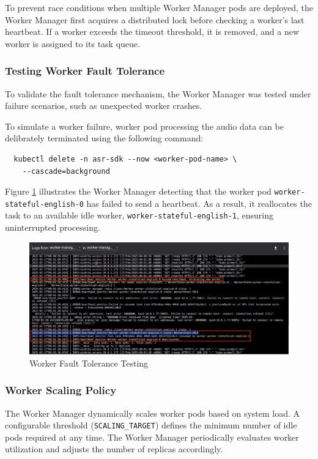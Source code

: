 To prevent race conditions when multiple Worker Manager pods are deployed, the Worker Manager first acquires a distributed lock before checking a worker’s last heartbeat. If a worker exceeds the timeout threshold, it is removed, and a new worker is assigned to its task queue.

\subsubsection{Testing Worker Fault Tolerance}
To validate the fault tolerance mechanism, the Worker Manager was tested under failure scenarios, such as unexpected worker crashes.

To simulate a worker failure, worker pod processing the audio data can be delibrately terminated using the following command:
\begin{verbatim}
  kubectl delete -n asr-sdk --now <worker-pod-name> \
    --cascade=background
\end{verbatim}

Figure \ref{fig:worker_fault_tolerance} illustrates the Worker Manager detecting that the worker pod \texttt{worker-\allowbreak stateful-english-0} has failed to send a heartbeat. As a result, it reallocates the task to an available idle worker, \texttt{worker-stateful-english-1}, ensuring uninterrupted processing.

\begin{figure}[ht]
  \centering
  \includegraphics[width=\textwidth]{figures/worker_fault_tolerance.png}
  \caption{Worker Fault Tolerance Testing}
  \label{fig:worker_fault_tolerance}
\end{figure}

\subsubsection{Worker Scaling Policy}
The Worker Manager dynamically scales worker pods based on system load. A configurable threshold (\texttt{SCALING\_TARGET}) defines the minimum number of idle pods required at any time. The Worker Manager periodically evaluates worker utilization and adjusts the number of replicas accordingly. 

